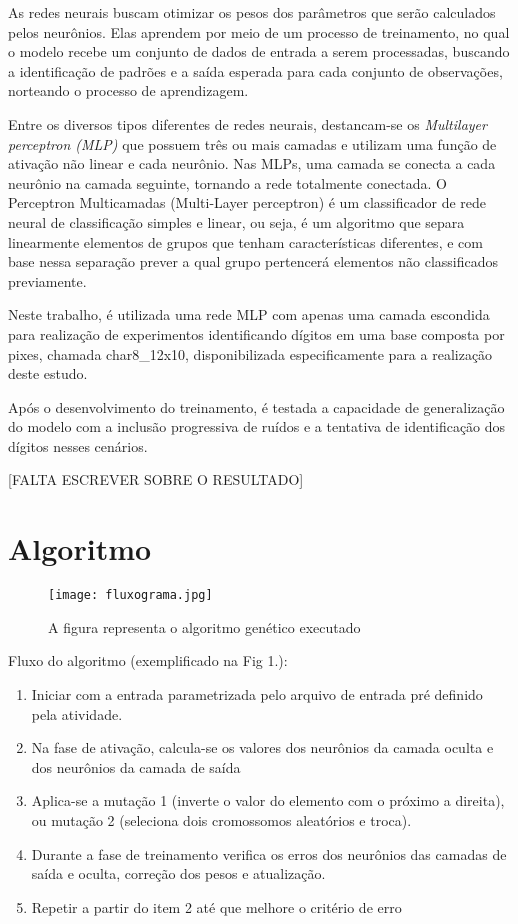 \documentclass[runningheads]{llncs}
\begin{document}
As redes neurais buscam otimizar os pesos dos parâmetros que serão calculados pelos neurônios. Elas aprendem por meio de um processo de treinamento, no qual o modelo recebe um conjunto de dados de entrada a serem processadas, buscando a identificação de padrões e a saída esperada para cada conjunto de observações, norteando o processo de aprendizagem. \cite{M}

Entre os diversos tipos diferentes de redes neurais, destancam-se os \textit{Multilayer perceptron (MLP)} que possuem três ou mais camadas e utilizam uma função de ativação não linear e cada neurônio. Nas MLPs, uma camada se conecta a cada neurônio na camada seguinte, tornando a rede totalmente conectada.  \cite{M} 
O Perceptron Multicamadas (Multi-Layer perceptron) é um classificador de rede neural de classificação simples e linear, ou seja, é um algoritmo que separa linearmente elementos de grupos que tenham características diferentes, e com base nessa separação prever a qual grupo pertencerá elementos não classificados previamente.


Neste trabalho, é utilizada uma rede MLP com apenas uma camada escondida para realização de experimentos identificando dígitos em uma base composta por pixes, chamada char8_12x10, disponibilizada especificamente para a realização deste estudo.

Após o desenvolvimento do treinamento, é testada a capacidade de generalização do modelo com a inclusão progressiva de ruídos e a tentativa de identificação dos dígitos nesses cenários.

[FALTA ESCREVER SOBRE O RESULTADO]




\section{Algoritmo}

\begin{figure}
\begin{center}
\texttt{[image: fluxograma.jpg]}
\end{center}
\caption{A figura representa o algoritmo genético executado} \label{fig1}
\end{figure}

Fluxo do algoritmo (exemplificado na Fig 1.):
\begin{enumerate}
	\item Iniciar com a entrada parametrizada pelo arquivo de entrada pré definido pela atividade.
	\item Na fase de ativação, calcula-se os valores dos neurônios da camada oculta e dos neurônios da camada de saída
	\item Aplica-se a mutação 1 (inverte o valor do elemento com o próximo a direita), ou mutação 2 (seleciona dois cromossomos aleatórios e troca).
	\item Durante a fase de treinamento verifica os erros dos neurônios das camadas de saída e oculta, correção dos pesos e atualização.
	\item Repetir a partir do item 2 até que melhore o critério de erro
\end{enumerate}
\end{document}
